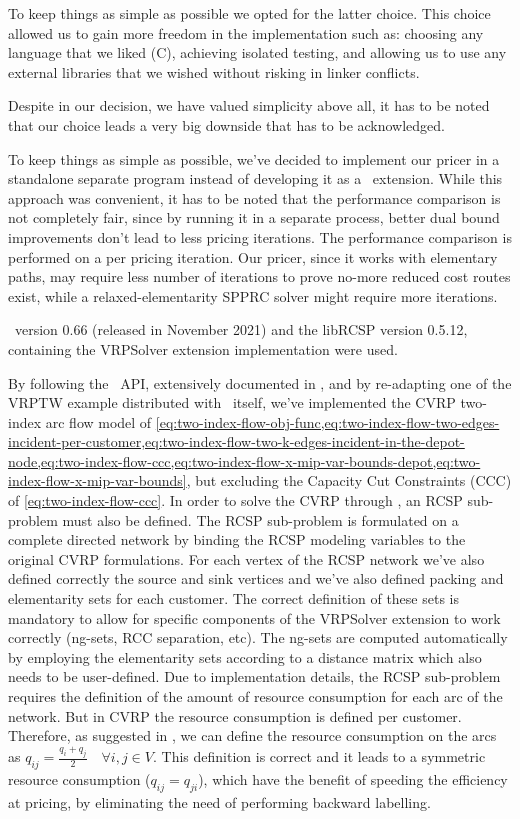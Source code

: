 To keep things as simple as possible we opted for the latter choice.
This choice allowed us to gain more freedom in the implementation
such as: choosing any language that we liked (C),
achieving isolated testing,
and allowing us to use any external libraries
that we wished without risking in linker conflicts.

Despite in our decision, we have valued simplicity above all,
it has to be noted that our choice leads a very big downside that has to be acknowledged.

To keep things as simple as possible, we've decided to implement our
pricer in a standalone separate program instead of developing it as a \bapcod\ extension.
While this approach was convenient, it has to be noted that the performance comparison is not
completely fair, since by running it in a separate process, better dual bound improvements
don't lead to less pricing iterations.
The performance comparison is performed on a per pricing iteration.
Our pricer, since it works with elementary paths, may require less number of iterations
to prove no-more reduced cost routes exist, while a relaxed-elementarity SPPRC solver
might require more iterations.

\bapcod\ version 0.66 (released in November 2021) and the libRCSP version 0.5.12,
containing the VRPSolver extension implementation were used.

By following the \bapcod\ API, extensively documented in \textcite{sadykov2021},
and by re-adapting one of the VRPTW example distributed with \bapcod\ itself,
we've implemented the CVRP two-index arc flow model
of \cref{eq:two-index-flow-obj-func,eq:two-index-flow-two-edges-incident-per-customer,eq:two-index-flow-two-k-edges-incident-in-the-depot-node,eq:two-index-flow-ccc,eq:two-index-flow-x-mip-var-bounds-depot,eq:two-index-flow-x-mip-var-bounds},
but excluding the Capacity Cut Constraints (CCC) of \cref{eq:two-index-flow-ccc}.
In order to solve the CVRP through \bapcod, an RCSP sub-problem must also be defined.
The RCSP sub-problem is formulated on a complete directed network by
binding the RCSP modeling variables to the original CVRP formulations.
For each vertex of the RCSP network we've also defined correctly the source
and sink vertices and we've also defined packing and elementarity sets
for each customer.
The correct definition of these sets is mandatory to allow for specific
components of the VRPSolver extension to work correctly (ng-sets, RCC separation, etc).
The ng-sets are computed automatically by employing the elementarity sets
according to a distance matrix which also needs to be user-defined.
Due to implementation details, the RCSP sub-problem requires
the definition of the amount of resource consumption for each arc of the network.
But in CVRP the resource consumption is defined per customer.
Therefore, as suggested in \textcite{pessoa2020a}, we can define the resource consumption
on the arcs as $q_{ij} = \frac{q_{i} + q_{j}}{2} \quad \forall i, j \in V$.
This definition is correct and it leads to a symmetric resource consumption ($q_{ij} = q_{ji}$),
which have the benefit of speeding the efficiency at pricing,
by eliminating the need of performing backward labelling.

